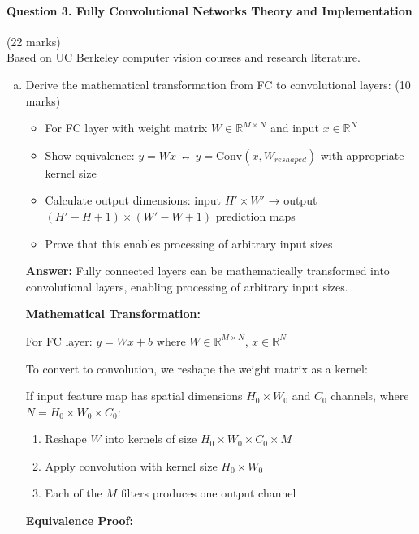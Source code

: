 \documentclass[12pt]{article}
\newcommand{\answer}[1]{{\color{answercolor}\textbf{Answer:} #1}}
\newcommand{\explanation}[1]{{\color{explanationcolor}#1}}
\begin{document}
\newpage
\paragraph{Question 3. Fully Convolutional Networks Theory and Implementation}{{\hfill (22 marks)}}\\
Based on UC Berkeley computer vision courses and research literature.

\begin{enumerate}[(a)]
    \item Derive the mathematical transformation from FC to convolutional layers: \hfill (10 marks)
    \begin{itemize}
        \item For FC layer with weight matrix $W \in \mathbb{R}^{M \times N}$ and input $x \in \mathbb{R}^N$
        \item Show equivalence: $y = Wx$ ↔ $y = \text{Conv}(x, W_{reshaped})$ with appropriate kernel size
        \item Calculate output dimensions: input $H' \times W'$ → output $(H'-H+1) \times (W'-W+1)$ prediction maps
        \item Prove that this enables processing of arbitrary input sizes
    \end{itemize}
    
    \answer{Fully connected layers can be mathematically transformed into convolutional layers, enabling processing of arbitrary input sizes.}
    
    \explanation{
    \textbf{Mathematical Transformation:}
    
    For FC layer: $y = Wx + b$ where $W \in \mathbb{R}^{M \times N}$, $x \in \mathbb{R}^N$
    
    To convert to convolution, we reshape the weight matrix as a kernel:
    
    If input feature map has spatial dimensions $H_0 \times W_0$ and $C_0$ channels, where $N = H_0 \times W_0 \times C_0$:
    
    \begin{enumerate}
        \item Reshape $W$ into kernels of size $H_0 \times W_0 \times C_0 \times M$
        \item Apply convolution with kernel size $H_0 \times W_0$
        \item Each of the $M$ filters produces one output channel
    \end{enumerate}
    
    \textbf{Equivalence Proof:}
    
}
\end{enumerate}
\end{document}
